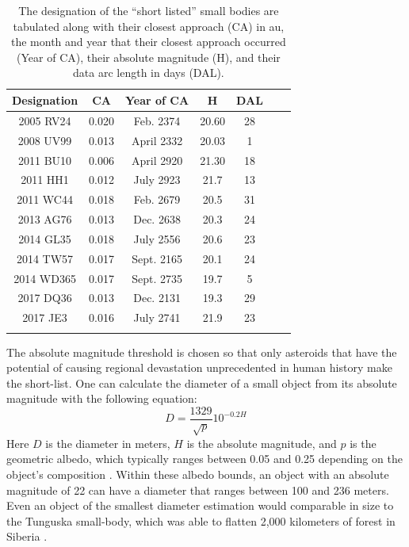 \documentclass{aa}
\begin{document}
\begin{table}[]
\begin{tabular}{ccccccc}
\hline \hline
\bf{Designation} & \bf{CA} & \bf{Year of CA} & \bf{H} & \bf{DAL} \\

\hline 

2005 RV24 & 0.020 &  Feb. 2374 & 20.60 & 28 \\
2008 UV99 & 0.013 &  April 2332 & 20.03 & 1 \\
2011 BU10 & 0.006 &  April 2920 & 21.30 & 18 \\ 
2011 HH1 & 0.012 &  July 2923 & 21.7 & 13 \\ 
2011 WC44 & 0.018 & Feb. 2679 & 20.5 & 31 \\ 
2013 AG76 & 0.013 &  Dec. 2638 & 20.3 & 24 \\ 
2014 GL35 & 0.018 & July 2556 & 20.6 & 23 \\ 
2014 TW57 & 0.017 & Sept. 2165 & 20.1 & 24 \\ 
2014 WD365 & 0.017 & Sept. 2735 & 19.7 & 5 \\
2017 DQ36 & 0.013 &  Dec. 2131 & 19.3 & 29 \\ 
2017 JE3 & 0.016 & July 2741 & 21.9 & 23 \\

\hline \hline

\vspace{0.5cm}
\end{tabular}
\caption{\label{TAB:Short_List} The designation of the ``short listed'' small bodies are tabulated along with their closest approach (CA) in au, the month and year that their closest approach occurred (Year of CA), their absolute magnitude (H), and their data arc length in days (DAL).}
\end{table}
The absolute magnitude threshold is chosen so that only asteroids that have the potential of causing regional devastation unprecedented in human history make the short-list. One can calculate the diameter of a small object from its absolute magnitude with the following equation:
\begin{equation}
\label{HtoDiameter}
D=\frac{1329}{\sqrt{p}}10^{-0.2H}
\end{equation}
Here $D$ is the diameter in meters, $H$ is the absolute magnitude, and $p$ is the geometric albedo, which typically ranges between 0.05 and 0.25 depending on the object's composition \citep{HConversion}. Within these albedo bounds, an object with an absolute magnitude of 22 can have a diameter that ranges between 100 and 236 meters. Even an object of the smallest diameter estimation would comparable in size to the Tunguska small-body, which was able to flatten 2,000 kilometers of forest in Siberia \citep{Tunguska}. 
 
\end{document}
